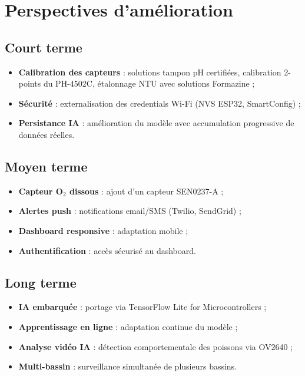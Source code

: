 \documentclass[12pt,a4paper]{report}
\begin{document}
\section{Perspectives d'amélioration}

\subsection{Court terme}
\begin{itemize}
  \item \textbf{Calibration des capteurs} : solutions tampon pH certifiées,
        calibration 2-points du PH-4502C, étalonnage NTU avec solutions Formazine ;
  \item \textbf{Sécurité} : externalisation des credentials Wi-Fi (NVS ESP32, SmartConfig) ;
  \item \textbf{Persistance IA} : amélioration du modèle avec accumulation progressive
        de données réelles.
\end{itemize}

\subsection{Moyen terme}
\begin{itemize}
  \item \textbf{Capteur O$_2$ dissous} : ajout d'un capteur SEN0237-A ;
  \item \textbf{Alertes push} : notifications email/SMS (Twilio, SendGrid) ;
  \item \textbf{Dashboard responsive} : adaptation mobile ;
  \item \textbf{Authentification} : accès sécurisé au dashboard.
\end{itemize}

\subsection{Long terme}
\begin{itemize}
  \item \textbf{IA embarquée} : portage via TensorFlow Lite for Microcontrollers ;
  \item \textbf{Apprentissage en ligne} : adaptation continue du modèle ;
  \item \textbf{Analyse vidéo IA} : détection comportementale des poissons via OV2640 ;
  \item \textbf{Multi-bassin} : surveillance simultanée de plusieurs bassins.
\end{itemize}
\end{document}
